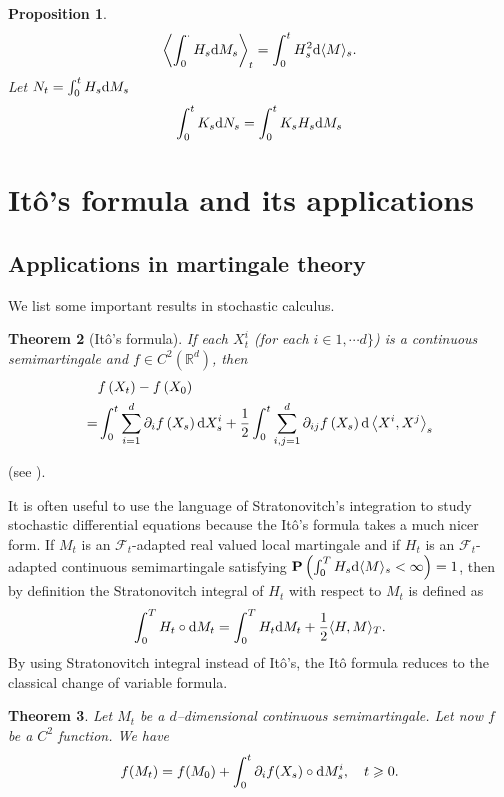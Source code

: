 \documentclass[twoside, 12pt]{book}
\numberwithin{equation}{chapter}
\newtheorem{theorem}{Theorem}[section]
\newtheorem{proposition}[theorem]{Proposition}
\def\cF{{\mathcal F}}
\def\mR{{\mathbb R}}
\def\bP{{\mathbf P}}
\def\l{\left}
\def\r{\right}
\def\<{\langle}
\def\>{\rangle}
\def\geq{\geqslant}
\def\d{\text{\rm{d}}}
\begin{document}
	\begin{proposition}
		\begin{equation*}
			\l\<\int_0^\cdot H_s \d M_s\r\>_t= \int_0^t H_s^2 \d \<M\>_s. 
		\end{equation*}
		Let $N_t=\int_0^t H_s\d M_s$
		\begin{equation*}
			\int_0^t K_s\d N_s=\int_0^t K_s H_s \d M_s
		\end{equation*}
	\end{proposition}
	
	\section{It\^o's formula and its applications}
	
	\subsection{Applications in martingale theory}
	We list some important results in stochastic calculus. 
	\begin{theorem}[It\^o's formula]
		If each $X_t^i$ (for each $i\in 1,\cdots d\}$) is a continuous semimartingale and $f\in C^2(\mR^d)$, then \begin{equation}\label{eq:Ito}
			\begin{aligned}
				&f\left(X_t\right)  -f\left(X_0\right) \\
				= & \int_0^t \sum_{i=1}^d \partial_i f\left(X_s\right) \d X_s^i+\frac{1}{2} \int_0^t \sum_{i, j=1}^d \partial_{i j} f\left(X_s\right) \d\left\langle X^i, X^j\right\rangle_s
			\end{aligned}
		\end{equation}
	\end{theorem}
	(see \cite[Theorem 13.5]{Huang}). 

 It is often useful to use the language of Stratonovitch's integration to study stochastic differential equations because the Itô’s formula takes a much nicer form. If $M_t$ is an $\cF_t$-adapted real valued local martingale and if $H_t$ is an $\cF_t$-adapted continuous semimartingale satisfying $\bP\left(\int_0^TH_s\d \<M\>_s<\infty\right)=1$, then by definition the Stratonovitch integral of  $H_t$ with respect to $M_t$ is defined as
\[
    \int_0^T H_t \circ \d  M_t =\int_0^T H_t\d M_t+\frac{1}{2} \langle H, M \rangle_T. 
\]
By using Stratonovitch integral instead of Itô’s, the Itô formula reduces to the classical change of variable formula.

\begin{theorem}\label{thm:Stra}
    Let  $M_t$ be a $d$–dimensional continuous semimartingale. Let now $f$ be a $C^2$ function. We have
    \[
    f(M_t)  =f(M_0)+\int_0^t \partial_i f (X_s) \circ \d M^i_s, \quad t \geq 0.
    \]
\end{theorem}
	
\end{document}
